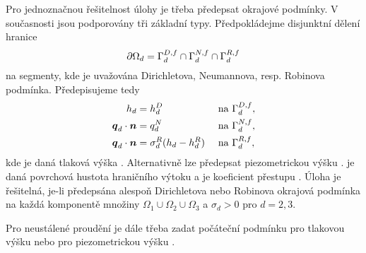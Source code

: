 Pro jednoznačnou řešitelnost úlohy je třeba předepsat okrajové podmínky. V současnosti jsou podporovány tři základní typy. 
Předpokládejme disjunktní dělení hranice
\[
    \partial\Omega_d = \Gamma_d^{D,f} \cap \Gamma_d^{N,f} \cap \Gamma_d^{R,f}
\]
na segmenty, kde je uvažována Dirichletova, Neumannova, resp. Robinova podmínka. Předepisujeme tedy
\begin{align}
    h_d &= h_d^D        &&\text{ na }\Gamma_d^{D,f},\\
    \mathbf{\boldsymbol{q}}_d \cdot \mathbf{\boldsymbol{n}} &= q_d^N         &&\text{ na }\Gamma_d^{N,f},\\
    \mathbf{\boldsymbol{q}}_d \cdot \mathbf{\boldsymbol{n}} &= \sigma_d^R ( h_d - h_d^R)     &&\text{ na }\Gamma_d^{R,f},
\end{align}
kde
je daná tlaková výška . Alternativně lze předepsat piezometrickou výšku
.
je daná povrchová hustota hraničního výtoku  a
je koeficient přestupu .
Úloha je řešitelná, je-li předepsána alespoň Dirichletova nebo Robinova okrajová podmínka na každá komponentě množiny $\Omega_1 \cup \Omega_2 \cup \Omega_3$ a $\sigma_d >0$ pro $d=2,3$.

Pro neustálené proudění je dále třeba zadat počáteční podmínku pro tlakovou výšku
nebo pro piezometrickou výšku
.




